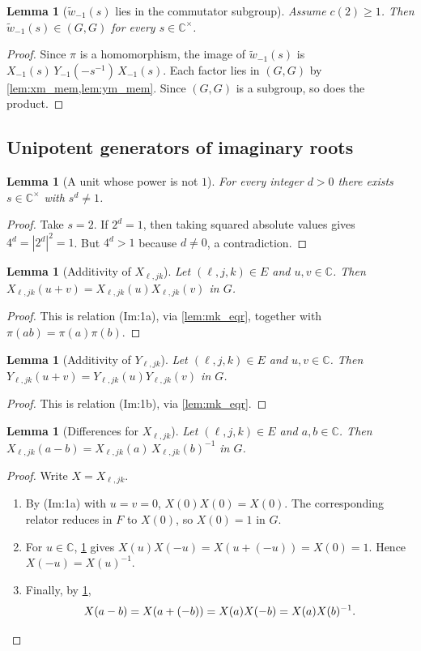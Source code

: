 \documentclass[11pt]{article}
\newtheorem{lemma}[theorem]{Lemma}
\theoremstyle{definition}
\theoremstyle{remark}
\newcommand{\C}{\mathbb{C}}
\newcommand{\Cx}{\mathbb{C}^{\times}}
\newcommand{\wt}{\widetilde{w}}
\newcommand{\comm}{(G,G)}
\begin{document}
\begin{lemma}[$\wt_{-1}(s)$ lies in the commutator subgroup]\label{lem:wm_mem}
Assume $c(2)\ge 1$. Then $\wt_{-1}(s)\in\comm$ for every $s\in\Cx$.
\end{lemma}
\begin{proof}
Since $\pi$ is a homomorphism, the image of $\wt_{-1}(s)$ is $X_{-1}(s)\,Y_{-1}(-s^{-1})\,X_{-1}(s)$. Each factor lies in $\comm$ by \cref{lem:xm_mem,lem:ym_mem}. Since $\comm$ is a subgroup, so does the product.
\end{proof}

\subsection{Unipotent generators of imaginary roots}

\begin{lemma}[A unit whose power is not $1$]\label{lem:exists_unit_pow_ne_one}
For every integer $d>0$ there exists $s\in\Cx$ with $s^d\ne 1$.
\end{lemma}
\begin{proof}
Take $s=2$. If $2^d=1$, then taking squared absolute values gives $4^d=|2^d|^2=1$. But $4^d>1$ because $d\neq 0$, a contradiction.
\end{proof}

\begin{lemma}[Additivity of $X_{\ell,jk}$]\label{lem:xx_add_mk}
Let $(\ell,j,k)\in E$ and $u,v\in\C$. Then $X_{\ell,jk}(u+v)=X_{\ell,jk}(u)X_{\ell,jk}(v)$ in $G$.
\end{lemma}
\begin{proof}
This is relation (Im:1a), via \cref{lem:mk_eqr}, together with $\pi(ab)=\pi(a)\pi(b)$.
\end{proof}

\begin{lemma}[Additivity of $Y_{\ell,jk}$]\label{lem:yy_add_mk}
Let $(\ell,j,k)\in E$ and $u,v\in\C$. Then $Y_{\ell,jk}(u+v)=Y_{\ell,jk}(u)Y_{\ell,jk}(v)$ in $G$.
\end{lemma}
\begin{proof}
This is relation (Im:1b), via \cref{lem:mk_eqr}.
\end{proof}

\begin{lemma}[Differences for $X_{\ell,jk}$]\label{lem:xx_sub_mk}
Let $(\ell,j,k)\in E$ and $a,b\in\C$. Then $X_{\ell,jk}(a-b)=X_{\ell,jk}(a)\,X_{\ell,jk}(b)^{-1}$ in $G$.
\end{lemma}
\begin{proof}
Write $X=X_{\ell,jk}$.
\begin{enumerate}
\item By (Im:1a) with $u=v=0$, $X(0)X(0)=X(0)$. The corresponding relator reduces in $F$ to $X(0)$, so $X(0)=1$ in $G$.
\item For $u\in\C$, \cref{lem:xx_add_mk} gives $X(u)X(-u)=X(u+(-u))=X(0)=1$. Hence $X(-u)=X(u)^{-1}$.
\item Finally, by \cref{lem:xx_add_mk},
\[
X(a-b)=X(a+(-b))=X(a)X(-b)=X(a)X(b)^{-1}. \qedhere
\]
\end{enumerate}
\end{proof}
\end{document}
